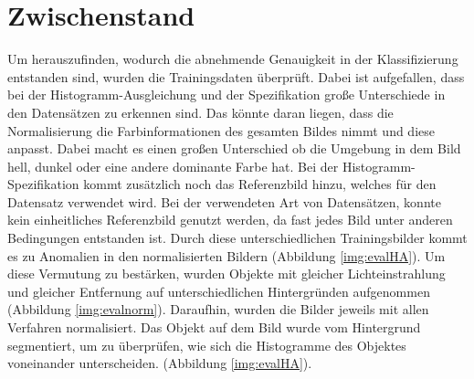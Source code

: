 \section{Zwischenstand}
Um herauszufinden, wodurch die abnehmende Genauigkeit in der Klassifizierung entstanden sind, wurden die Trainingsdaten überprüft. Dabei ist aufgefallen, dass bei der Histogramm-Ausgleichung und der Spezifikation große Unterschiede in den Datensätzen zu erkennen sind. Das könnte daran liegen, dass die Normalisierung die Farbinformationen des gesamten Bildes nimmt und diese anpasst. Dabei macht es einen großen Unterschied ob die Umgebung in dem Bild hell, dunkel oder eine andere dominante Farbe hat. Bei der Histogramm-Spezifikation kommt zusätzlich noch das Referenzbild hinzu, welches für den Datensatz verwendet wird. Bei der verwendeten Art von Datensätzen, konnte kein einheitliches Referenzbild genutzt werden, da fast jedes Bild unter anderen Bedingungen entstanden ist. Durch diese unterschiedlichen Trainingsbilder kommt es zu Anomalien in den normalisierten Bildern (Abbildung \ref{img:evalHA}). Um diese Vermutung zu bestärken, wurden Objekte mit gleicher Lichteinstrahlung und gleicher Entfernung auf unterschiedlichen Hintergründen aufgenommen (Abbildung \ref{img:evalnorm}). Daraufhin, wurden die Bilder jeweils mit allen Verfahren normalisiert. Das Objekt auf dem Bild wurde vom Hintergrund segmentiert, um zu überprüfen, wie sich die Histogramme des Objektes voneinander unterscheiden. (Abbildung \ref{img:evalHA}).\\
